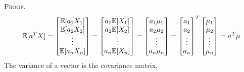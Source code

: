 \medskip\noindent\textsc{Proof}.
$$
\mathbb{E}[a^TX] =
\begin{bmatrix} 
    \mathbb{E}[a_1X_1] \\ 
    \mathbb{E}[a_2X_2] \\ 
    \vdots \\ 
    \mathbb{E}[a_nX_n] \\ 
\end{bmatrix} =
\begin{bmatrix} 
    a_1\mathbb{E}[X_1] \\ 
    a_2\mathbb{E}[X_2] \\ 
    \vdots \\ 
    a_n\mathbb{E}[X_n] \\ 
\end{bmatrix} =
\begin{bmatrix} 
    a_1\mu_1 \\ 
    a_2\mu_2 \\ 
    \vdots \\ 
    a_n\mu_n \\ 
\end{bmatrix} =
\begin{bmatrix} 
    a_1 \\ 
    a_2 \\ 
    \vdots \\ 
    a_n \\ 
\end{bmatrix}^T
\begin{bmatrix} 
    \mu_1 \\ 
    \mu_2 \\ 
    \vdots \\ 
    \mu_n \\ 
\end{bmatrix} =
a^T\mu
$$
The variance of a vector is the covariance matrix.
